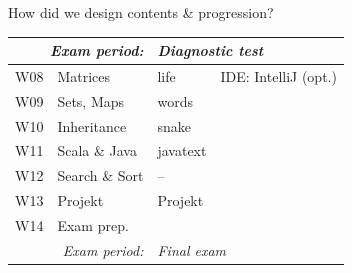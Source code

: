 \documentclass[aspectratio=169]{beamer}
\newenvironment{Slide}[1]%
  {\begin{frame}[environment=Slide]{#1}}
  {\end{frame}}%
\begin{document}
\begin{Slide}{How did we design contents \& progression?}
\begin{minipage}{0.55\textwidth}
\begin{tabular}{|l|l|l|l|}
      \multicolumn{2}{r}{\textit{Exam period:}} & \multicolumn{2}{l}{\textit{Diagnostic test}} \\ \hline
      W08 & Matrices        & life        & IDE: IntelliJ (opt.)\\
      W09 & Sets, Maps      & words       & \\
      W10 & Inheritance     & snake       & \\
      W11 & Scala \& Java   & javatext    & \\
      W12 & Search \& Sort  & --          & \\
      W13 & Projekt         & Projekt     & \\
      W14 & Exam prep.      &             & \\ \hline
      \multicolumn{2}{r}{\textit{Exam period:}} & \multicolumn{2}{l}{\textit{Final exam}} \\ \hline
      \end{tabular}  


\end{minipage}
\end{Slide}
\end{document}
